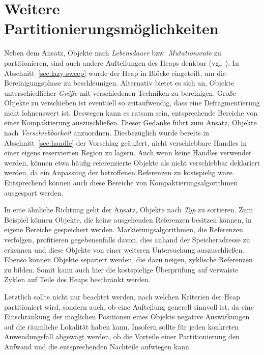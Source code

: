 \section{Weitere Partitionierungsmöglichkeiten}
\label{sec:partitioning}
Neben dem Ansatz, Objekte nach \textit{Lebensdauer} bzw. \textit{Mutationsrate} zu partitionieren, sind auch andere Aufteilungen des Heaps denkbar (vgl. \cite[Kap. 8]{handbook}).
In Abschnitt~\ref{sec:lazy-sweep} wurde der Heap in Blöcke eingeteilt, um die Bereinigungsphase zu beschleunigen.
Alternativ bietet es sich an, Objekte unterschiedlicher \textit{Größe} mit verschiedenen Techniken zu bereinigen.
Große Objekte zu verschieben ist eventuell so zeitaufwendig, dass eine Defragmentierung nicht lohnenswert ist.
Deswegen kann es ratsam sein, entsprechende Bereiche von einer Kompaktierung auszuschließen.
Dieser Gedanke führt zum Ansatz, Objekte nach \textit{Verschiebbarkeit} anzuordnen.
Diesbezüglich wurde bereits in Abschnitt~\ref{sec:handle} der Vorschlag geäußert, nicht verschiebbare Handles in einer eigens reservierten Region zu lagern.
Auch wenn keine Handles verwendet werden, können etwa häufig referenzierte Objekte als nicht verschiebbar deklariert werden, da ein Anpassung der betroffenen Referenzen zu kostspielig wäre.
Entsprechend können auch diese Bereiche von Kompaktierungsalgorithmen ausgespart werden.

In eine ähnliche Richtung geht der Ansatz, Objekte nach \textit{Typ} zu sortieren.
Zum Beispiel können Objekte, die keine ausgehenden Referenzen besitzen können, in eigene Bereiche gespeichert werden.
Markierungsalgorithmen, die Referenzen verfolgen, profitieren gegebenenfalls davon, dies anhand der Speicheradresse zu erkennen und diese Objekte von einer weiteren Untersuchung auszuschließen.
Ebenso können Objekte separiert werden, die dazu neigen, zyklische Referenzen zu bilden.
Somit kann auch hier die kostspielige Überprüfung auf verwaiste Zyklen auf Teile des Heaps beschränkt werden.

Letztlich sollte nicht nur beachtet werden, nach welchen Kriterien der Heap partitioniert wird, sondern auch, ob eine Aufteilung generell sinnvoll ist, da eine Einschränkung der möglichen Positionen eines Objekts negative Auswirkungen auf die räumliche Lokalität haben kann.
Insofern sollte für jeden konkreten Anwendungsfall abgewägt werden, ob die Vorteile einer Partitionierung den Aufwand und die entsprechenden Nachteile aufwiegen kann.